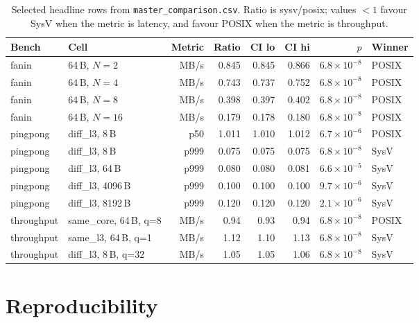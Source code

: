\documentclass[a4paper,11pt]{article}
\begin{document}
\begin{table}[H]
\centering
\caption{Selected headline rows from \texttt{master\_comparison.csv}.
Ratio is sysv/posix; values $<1$ favour SysV when the metric is
latency, and favour POSIX when the metric is throughput.}
\label{tab:master}
\small
\begin{tabular}{llrrrrrl}
\toprule
\textbf{Bench} & \textbf{Cell} & \textbf{Metric} & \textbf{Ratio} & \textbf{CI lo} & \textbf{CI hi} & \textbf{$p$} & \textbf{Winner} \\
\midrule
fanin   & 64\,B, $N=2$         & MB/s    & 0.845 & 0.845 & 0.866 & $6.8\!\times\!10^{-8}$ & POSIX \\
fanin   & 64\,B, $N=4$         & MB/s    & 0.743 & 0.737 & 0.752 & $6.8\!\times\!10^{-8}$ & POSIX \\
fanin   & 64\,B, $N=8$         & MB/s    & 0.398 & 0.397 & 0.402 & $6.8\!\times\!10^{-8}$ & POSIX \\
fanin   & 64\,B, $N=16$        & MB/s    & 0.179 & 0.178 & 0.180 & $6.8\!\times\!10^{-8}$ & POSIX \\
\midrule
pingpong & diff\_l3, 8\,B      & p50     & 1.011 & 1.010 & 1.012 & $6.7\!\times\!10^{-6}$ & POSIX \\
pingpong & diff\_l3, 8\,B      & p999    & 0.075 & 0.075 & 0.075 & $6.8\!\times\!10^{-8}$ & SysV  \\
pingpong & diff\_l3, 64\,B     & p999    & 0.080 & 0.080 & 0.081 & $6.6\!\times\!10^{-5}$ & SysV  \\
pingpong & diff\_l3, 4096\,B   & p999    & 0.100 & 0.100 & 0.100 & $9.7\!\times\!10^{-6}$ & SysV  \\
pingpong & diff\_l3, 8192\,B   & p999    & 0.120 & 0.120 & 0.120 & $2.1\!\times\!10^{-6}$ & SysV  \\
\midrule
throughput & same\_core, 64\,B, q=8  & MB/s & 0.94 & 0.93 & 0.94 & $6.8\!\times\!10^{-8}$ & POSIX \\
throughput & same\_l3,   64\,B, q=1  & MB/s & 1.12 & 1.10 & 1.13 & $6.8\!\times\!10^{-8}$ & SysV  \\
throughput & diff\_l3,    8\,B, q=32 & MB/s & 1.05 & 1.05 & 1.06 & $6.8\!\times\!10^{-8}$ & SysV  \\
\bottomrule
\end{tabular}
\end{table}

\section{Reproducibility}
\label{app:repro}
\end{document}
